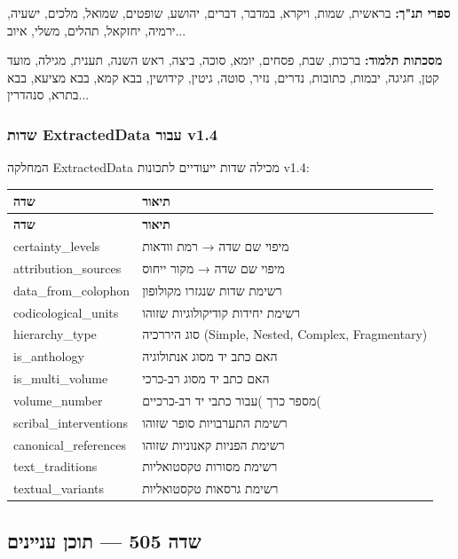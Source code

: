 \documentclass[12pt,a4paper]{article}
\begin{document}
\textbf{ספרי תנ"ך:}
בראשית, שמות, ויקרא, במדבר, דברים, יהושע, שופטים, שמואל, מלכים, ישעיה, ירמיה, יחזקאל, תהלים, משלי, איוב...

\textbf{מסכתות תלמוד:}
ברכות, שבת, פסחים, יומא, סוכה, ביצה, ראש השנה, תענית, מגילה, מועד קטן, חגיגה, יבמות, כתובות, נדרים, נזיר, סוטה, גיטין, קידושין, בבא קמא, בבא מציעא, בבא בתרא, סנהדרין...

\subsubsection{שדות ExtractedData עבור v1.4}

המחלקה \textenglish{ExtractedData} מכילה שדות ייעודיים לתכונות v1.4:

\begin{longtable}{|L{5cm}|p{11cm}|}
\hline
\textbf{שדה} & \textbf{תיאור} \\
\hline
\endfirsthead
\hline
\textbf{שדה} & \textbf{תיאור} \\
\hline
\endhead
\hline
\endfoot
\textenglish{certainty\_levels} & מיפוי שם שדה → רמת וודאות \\
\hline
\textenglish{attribution\_sources} & מיפוי שם שדה → מקור ייחוס \\
\hline
\textenglish{data\_from\_colophon} & רשימת שדות שנגזרו מקולופון \\
\hline
\textenglish{codicological\_units} & רשימת יחידות קודיקולוגיות שזוהו \\
\hline
\textenglish{hierarchy\_type} & סוג היררכיה \textenglish{(Simple, Nested, Complex, Fragmentary)} \\
\hline
\textenglish{is\_anthology} & האם כתב יד מסוג אנתולוגיה \\
\hline
\textenglish{is\_multi\_volume} & האם כתב יד מסוג רב-כרכי \\
\hline
\textenglish{volume\_number} & מספר כרך )עבור כתבי יד רב-כרכיים( \\
\hline
\textenglish{scribal\_interventions} & רשימת התערבויות סופר שזוהו \\
\hline
\textenglish{canonical\_references} & רשימת הפניות קאנוניות שזוהו \\
\hline
\textenglish{text\_traditions} & רשימת מסורות טקסטואליות \\
\hline
\textenglish{textual\_variants} & רשימת גרסאות טקסטואליות \\
\hline
\end{longtable}

\subsection{שדה 505 — תוכן עניינים}
\end{document}
